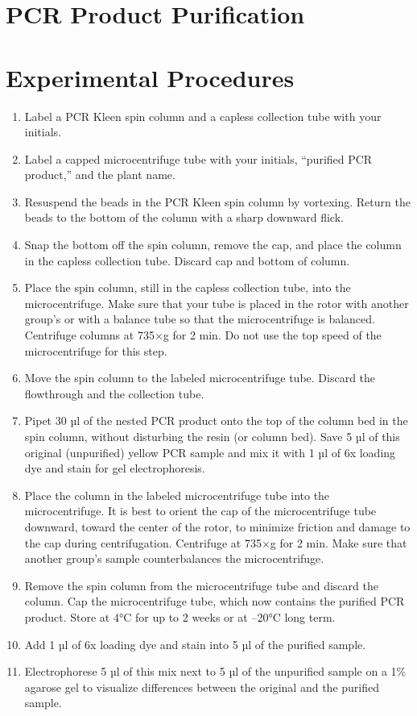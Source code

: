 \documentclass[]{book}
\providecommand{\tightlist}{%
  \setlength{\itemsep}{0pt}\setlength{\parskip}{0pt}}
\theoremstyle{definition}
\theoremstyle{definition}
\theoremstyle{definition}
\theoremstyle{remark}
\begin{document}
\section{PCR Product Purification}\label{pcr-product-purification}

\section{Experimental Procedures}\label{experimental-procedures-12}

\begin{enumerate}
\def\labelenumi{\arabic{enumi}.}
\tightlist
\item
  Label a PCR Kleen spin column and a capless collection tube with your
  initials.
\item
  Label a capped microcentrifuge tube with your initials, ``purified PCR
  product,'' and the plant name.
\item
  Resuspend the beads in the PCR Kleen spin column by vortexing. Return
  the beads to the bottom of the column with a sharp downward flick.
\item
  Snap the bottom off the spin column, remove the cap, and place the
  column in the capless collection tube. Discard cap and bottom of
  column.
\item
  Place the spin column, still in the capless collection tube, into the
  microcentrifuge. Make sure that your tube is placed in the rotor with
  another group's or with a balance tube so that the microcentrifuge is
  balanced. Centrifuge columns at 735×g for 2 min. Do not use the top
  speed of the microcentrifuge for this step.
\item
  Move the spin column to the labeled microcentrifuge tube. Discard the
  flowthrough and the collection tube.
\item
  Pipet 30 µl of the nested PCR product onto the top of the column bed
  in the spin column, without disturbing the resin (or column bed). Save
  5 µl of this original (unpurified) yellow PCR sample and mix it with 1
  µl of 6x loading dye and stain for gel electrophoresis.
\item
  Place the column in the labeled microcentrifuge tube into the
  microcentrifuge. It is best to orient the cap of the microcentrifuge
  tube downward, toward the center of the rotor, to minimize friction
  and damage to the cap during centrifugation. Centrifuge at 735×g for 2
  min. Make sure that another group's sample counterbalances the
  microcentrifuge.
\item
  Remove the spin column from the microcentrifuge tube and discard the
  column. Cap the microcentrifuge tube, which now contains the purified
  PCR product. Store at 4°C for up to 2 weeks or at --20°C long term.
\item
  Add 1 µl of 6x loading dye and stain into 5 µl of the purified sample.
\item
  Electrophorese 5 µl of this mix next to 5 µl of the unpurified sample
  on a 1\% agarose gel to visualize differences between the original and
  the purified sample.
\end{enumerate}
\end{document}
